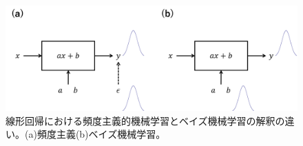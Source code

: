 \documentclass[dvipdfmx, 9pt, a4paper]{jsarticle}
\begin{document}
\begin{figure}[b]
\begin{center}
\includegraphics[width=15cm]{"fig5.png"}
\caption{線形回帰における頻度主義的機械学習とベイズ機械学習の解釈の違い。(a)頻度主義(b)ベイズ機械学習。}
\end{center}
\end{figure}
\end{document}
